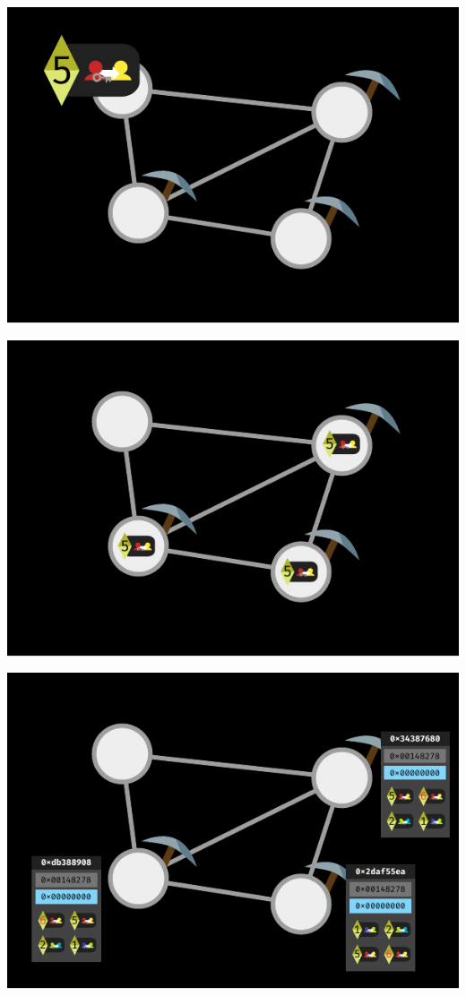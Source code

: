 \documentclass[xcolor=x11names,compress]{beamer}
\begin{document}
\begin{frame}
\begin{overprint}
\begin{center}
			\includegraphics[width=\textwidth,height=0.8\textheight,keepaspectratio]{img/mining/03.pdf}
		\end{center}
		\begin{center}
			\includegraphics[width=\textwidth,height=0.8\textheight,keepaspectratio]{img/mining/04.pdf}
		\end{center}
		\begin{center}
			\includegraphics[width=\textwidth,height=0.8\textheight,keepaspectratio]{img/mining/05.pdf}

\end{center}
\end{overprint}
\end{frame}
\end{document}

